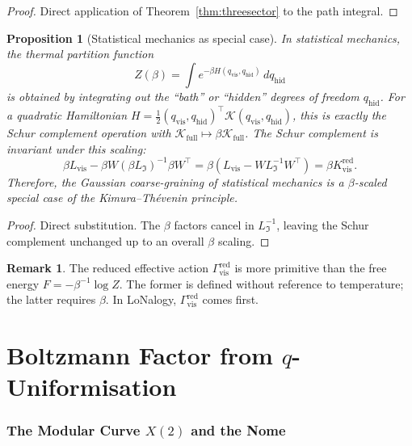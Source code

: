 \documentclass[12pt]{article}
\theoremstyle{plain}
\newtheorem{proposition}[theorem]{Proposition}
\theoremstyle{definition}
\newtheorem{remark}[theorem]{Remark}
\numberwithin{equation}{section}
\newcommand{\vis}{\mathrm{vis}}
\newcommand{\red}{\mathrm{red}}
\newcommand{\hid}{\mathrm{hid}}
\newcommand{\fI}{\mathfrak{I}}
\begin{document}
\begin{proof}
Direct application of Theorem~\ref{thm:threesector} to the path integral.
\end{proof}

\begin{proposition}[Statistical mechanics as special case]\label{prop:statmech}
In statistical mechanics, the thermal partition function
\begin{equation}
Z(\beta) = \int e^{-\beta H(q_{\vis},q_{\hid})}\,dq_{\hid}
\end{equation}
is obtained by integrating out the ``bath'' or ``hidden'' degrees of
freedom $q_{\hid}$.  For a quadratic Hamiltonian
$H=\frac{1}{2}(q_{\vis},q_{\hid})^\top\mathcal{K}(q_{\vis},q_{\hid})$,
this is exactly the Schur complement operation with
$\mathcal{K}_{\mathrm{full}}\mapsto\beta\mathcal{K}_{\mathrm{full}}$.
The Schur complement is invariant under this scaling:
\begin{equation}
\beta L_{\vis}-\beta W(\beta L_{\fI})^{-1}\beta W^\top
= \beta\!\left(L_{\vis}-WL_{\fI}^{-1}W^\top\right)
= \beta K_{\vis}^{\red}.
\end{equation}
Therefore, the Gaussian coarse-graining of statistical mechanics is a
$\beta$-scaled special case of the Kimura--Th\'evenin principle.
\end{proposition}

\begin{proof}
Direct substitution.  The $\beta$ factors cancel in $L_{\fI}^{-1}$,
leaving the Schur complement unchanged up to an overall $\beta$ scaling.
\end{proof}

\begin{remark}
The reduced effective action $\Gamma_{\vis}^{\red}$ is more primitive
than the free energy $F=-\beta^{-1}\log Z$.  The former is defined
without reference to temperature; the latter requires $\beta$.
In LoNalogy, $\Gamma_{\vis}^{\red}$ comes first.
\end{remark}


\part{Boltzmann Factor from $q$-Uniformisation}

\section{The Modular Curve $X(2)$ and the Nome}\label{sec:nome}
\end{document}
